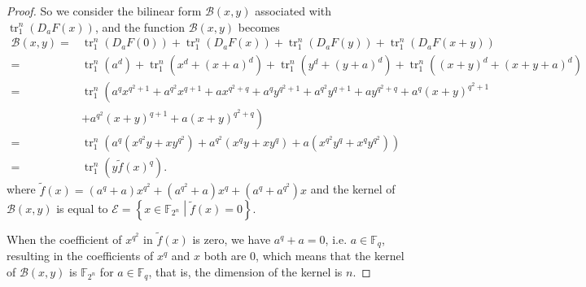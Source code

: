 \documentclass[12 pt]{article}
\def\F{{\mathbb F}}
\newcommand{\tr}{\operatorname{tr}_1^n}
\begin{document}
\begin{proof}
    So we consider the bilinear form $ \mathcal{B}(x,y) $ associated with $ \tr\left(D_aF(x)\right) $, 
    and the function $ \mathcal{B}(x,y) $ becomes
    \begin{align*}
      \mathcal{B}(x,y)=& \tr\left(D_aF(0)\right)+\tr\left(D_aF(x)\right)+\tr\left(D_aF(y)\right)+\tr\left( D_aF(x+y) \right)\\
                      =& \tr\left(a^d\right)+\tr\left(x^d+(x+a)^d\right)+\tr\left(y^d+(y+a)^d\right)+\tr\left((x+y)^d+(x+y+a)^d\right)\\
                      =& \tr\left( a^qx^{q^2+1}+a^{q^2}x^{q+1}+ax^{q^2+q}+a^qy^{q^2+1}+a^{q^2}y^{q+1}+ay^{q^2+q}+a^q(x+y)^{q^2+1}\right.\\
                       &\left.+a^{q^2}(x+y)^{q+1}+a(x+y)^{q^2+q} \right)\\
                      =& \tr\left( a^q\left( x^{q^2}y+xy^{q^2} \right)+ a^{q^2}\left( x^qy+xy^q \right)+ a\left( x^{q^2}y^q+x^qy^{q^2} \right) \right)\\
                      =& \tr\left(y\widetilde{f}(x)^q\right).
    \end{align*}
    where 
    $ \widetilde{f}(x)=\left( a^{q}+a \right)x^{q^2}+\left( a^{q^2}+a \right)x^{q }+\left( a^{q }+a^{q^2} \right)x $
    and the kernel of $ \mathcal{B}(x,y) $ is equal to $ \mathcal{E}=\left\{ x\in\F_{2^n}\middle|\widetilde{f}(x)=0 \right\} $. 
  
    When the coefficient of $ x^{q^2} $ in $ \widetilde{f}(x) $ is zero, 
    we have $ a^q+a=0 $, i.e. $ a\in\F_q $, resulting in the coefficients of $ x^q $ and $ x $ both are $ 0 $, 
    which means that the kernel of $ \mathcal{B}(x,y) $ is $ \F_{2^n} $ for $ a\in\F_q $, 
    that is, the dimension of the kernel is $ n $.
  

\end{proof}
\end{document}
